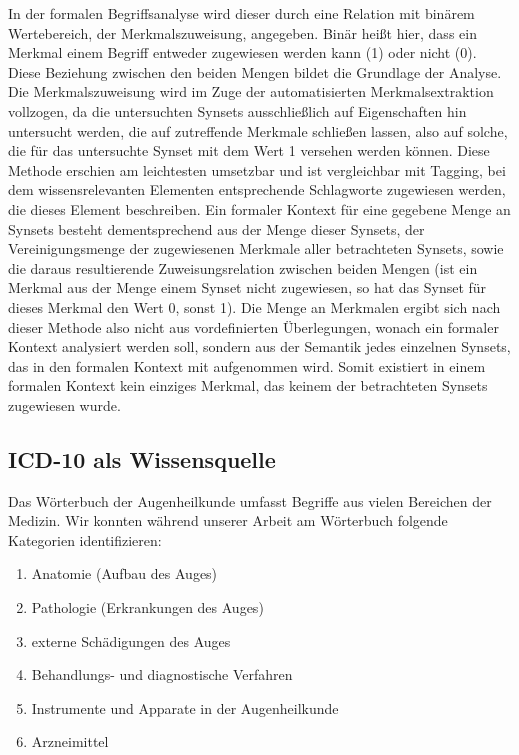 \documentclass[pagesize,DIV=calc,12pt,draft]{scrreprt}
\begin{document}
In der formalen Begriffsanalyse wird dieser durch eine Relation mit binärem Wertebereich, der Merkmalszuweisung, angegeben. 
Binär heißt hier, dass ein Merkmal einem Begriff entweder zugewiesen werden kann (1) oder nicht (0). 
Diese Beziehung zwischen den beiden Mengen bildet die Grundlage der Analyse. 
Die Merkmalszuweisung wird im Zuge der automatisierten Merkmalsextraktion vollzogen, da die untersuchten Synsets ausschließlich auf Eigenschaften hin untersucht werden, die auf zutreffende Merkmale schließen lassen, also auf solche, die für das untersuchte Synset mit dem Wert 1 versehen werden können. 
Diese Methode erschien am leichtesten umsetzbar und ist vergleichbar mit Tagging, bei dem wissensrelevanten Elementen entsprechende Schlagworte zugewiesen werden, die dieses Element beschreiben. 
Ein formaler Kontext für eine gegebene Menge an Synsets besteht dementsprechend aus der Menge dieser Synsets, der Vereinigungsmenge der zugewiesenen Merkmale aller betrachteten Synsets, sowie die daraus resultierende Zuweisungsrelation zwischen beiden Mengen (ist ein Merkmal aus der Menge einem Synset nicht zugewiesen, so hat das Synset für dieses Merkmal den Wert 0, sonst 1). 
Die Menge an Merkmalen ergibt sich nach dieser Methode also nicht aus vordefinierten Überlegungen, wonach ein formaler Kontext analysiert werden soll, sondern aus der Semantik jedes einzelnen Synsets, das in den formalen Kontext mit aufgenommen wird. 
Somit existiert in einem formalen Kontext kein einziges Merkmal, das keinem der betrachteten Synsets zugewiesen wurde. 

\subsection{ICD-10 als Wissensquelle}

Das Wörterbuch der Augenheilkunde umfasst Begriffe aus vielen Bereichen der Medizin. 
Wir konnten während unserer Arbeit am Wörterbuch folgende Kategorien identifizieren: 

\begin{enumerate}
\item
 Anatomie (Aufbau des Auges)
\item
 Pathologie (Erkrankungen des Auges)
\item
 externe Schädigungen des Auges
\item
 Behandlungs- und diagnostische Verfahren
\item
 Instrumente und Apparate in der Augenheilkunde
\item
 Arzneimittel
\end{enumerate}
\end{document}
